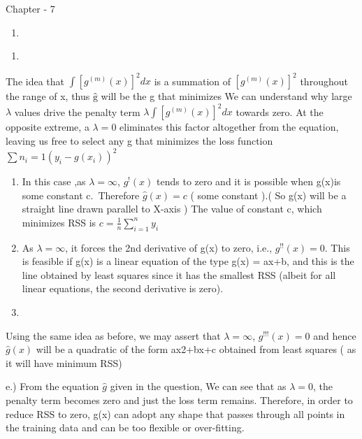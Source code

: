 \documentclass[
]{article}
\providecommand{\tightlist}{%
  \setlength{\itemsep}{0pt}\setlength{\parskip}{0pt}}
\begin{document}
Chapter - 7

\begin{enumerate}
\def\labelenumi{\arabic{enumi})}
\setcounter{enumi}{1}
\tightlist
\item
\end{enumerate}

\begin{enumerate}
\def\labelenumi{\alph{enumi})}
\tightlist
\item
\end{enumerate}

The idea that \(∫[g^{(m)}(x)]^2 dx\) is a summation of
\([g^{(m)}(x)]^2\) throughout the range of x, thus \(ĝ\) will be the g
that minimizes We can understand why large \(\lambda\) values drive the
penalty term \(\lambda∫[g^{(m)}(x)]^2dx\) towards zero. At the opposite
extreme, a \(\lambda= 0\) eliminates this factor altogether from the
equation, leaving us free to select any g that minimizes the loss
function \(\sum n_i= 1(y_i−g(x_i))^2\)

\begin{enumerate}
\def\labelenumi{\alph{enumi})}
\setcounter{enumi}{1}
\item
  In this case ,as \(\lambda=\infty\), \(g^!(x)\) tends to zero and it
  is possible when g(x)is some constant c.~Therefore \(\hat{g}(x)=c\) (
  some constant ).( So g(x) will be a straight line drawn parallel to
  X-axis ) The value of constant c, which minimizes RSS is
  \(c = \frac{1}{n}\sum_{i=1}^{n} y_i\)
\item
  As \(\lambda =\infty\), it forces the 2nd derivative of g(x) to zero,
  i.e., \(g^{!!}(x)= 0\). This is feasible if g(x) is a linear equation
  of the type g(x) = ax+b, and this is the line obtained by least
  squares since it has the smallest RSS (albeit for all linear
  equations, the second derivative is zero).
\item
\end{enumerate}

Using the same idea as before, we may assert that \(\lambda=\infty\),
\(g^{!!!}(x)=0\) and hence \(\hat{g}(x)\) will be a quadratic of the
form ax2+bx+c obtained from least squares ( as it will have minimum RSS)

e.) From the equation \(\hat{g}\) given in the question, We can see that
as \(\lambda=0\), the penalty term becomes zero and just the loss term
remains. Therefore, in order to reduce RSS to zero, g(x) can adopt any
shape that passes through all points in the training data and can be too
flexible or over-fitting.
\end{document}
